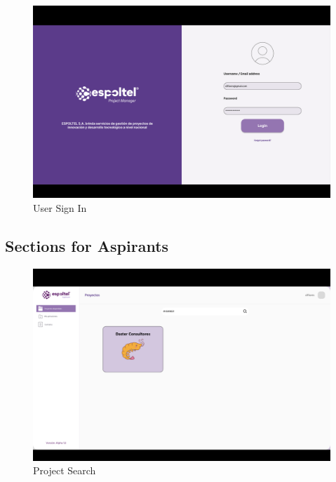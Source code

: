 \documentclass{scrreprt}
\begin{document}
\begin{figure}[H]
    
    \centering \small
    \includegraphics[width=1\textwidth]{WebPrototype/Loginpage.png}
    \caption{User Sign In}
\end{figure}

\subsection{Sections for Aspirants}



\begin{figure}[H]
    
    \centering \small
    \includegraphics[width=1\textwidth]{WebPrototype/Projectsflow2.png}
    \caption{Project Search}
\end{figure} 
\end{document}
